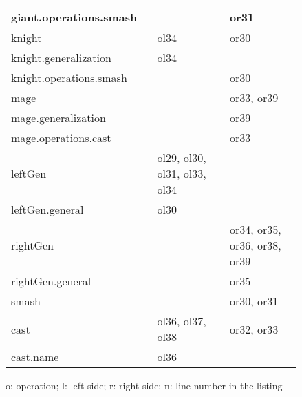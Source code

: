 \begin{table}[]
\begin{scriptsize}
\begin{tabular}{|m{0.38\linewidth}|m{0.23\linewidth}|m{0.23\linewidth}|}
            giant.operations.smash             &                                           & or31                                       \\ \hline
            knight                             & ol34                                      & or30                                       \\ \hline
            knight.generalization              & ol34                                      &                                            \\ \hline
            knight.operations.smash            &                                           & or30                                       \\ \hline
            mage                               &                                           & or33, or39                                 \\ \hline
            mage.generalization                &                                           & or39                                       \\ \hline
            mage.operations.cast               &                                           & or33                                       \\ \hline
            leftGen                            & ol29, ol30, ol31, ol33, ol34              &                                            \\ \hline
            leftGen.general                    & ol30                                      &                                            \\ \hline
            rightGen                           &                                           & or34, or35, or36, or38, or39               \\ \hline
            rightGen.general                   &                                           & or35                                       \\ \hline
            smash                              &                                           & or30, or31                                 \\ \hline
            cast                               & ol36, ol37, ol38                          & or32, or33                                 \\ \hline
            cast.name                          & ol36                                      &                                            \\ \hline
        \end{tabular}
        o: operation; l: left side; r: right side; n: line number in the listing
    \end{scriptsize}
\end{table}

